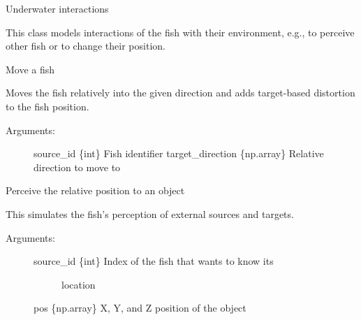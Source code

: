 \documentclass[letterpaper,10pt,english]{sphinxmanual}
\begin{document}
\begin{fulllineitems}
\label{\detokenize{index:interaction.Interaction}}
Underwater interactions

This class models interactions of the fish with their environment, e.g.,
to perceive other fish or to change their position.

\begin{fulllineitems}
\label{\detokenize{index:interaction.Interaction.move}}
Move a fish

Moves the fish relatively into the given direction and adds
target-based distortion to the fish position.
\begin{description}
\item[{Arguments:}] \leavevmode
source\_id \{int\} \textendash{} Fish identifier
target\_direction \{np.array\} \textendash{} Relative direction to move to

\end{description}

\end{fulllineitems}


\begin{fulllineitems}
\label{\detokenize{index:interaction.Interaction.perceive_object}}
Perceive the relative position to an object

This simulates the fish’s perception of external sources and targets.
\begin{description}
\item[{Arguments:}] \leavevmode\begin{description}
\item[{source\_id \{int\} \textendash{} Index of the fish that wants to know its}] \leavevmode
location

\end{description}

pos \{np.array\} \textendash{} X, Y, and Z position of the object


\end{description}
\end{fulllineitems}
\end{fulllineitems}
\end{document}
